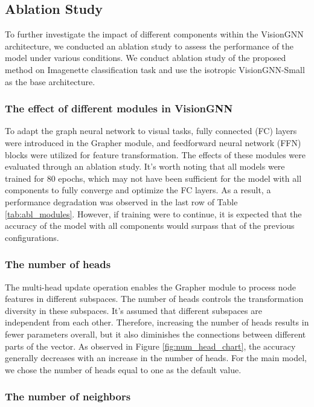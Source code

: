 \documentclass[sigconf, nonacm]{acmart}
\begin{document}
\subsection{Ablation Study}
To further investigate the impact of different components within the VisionGNN architecture, we conducted an ablation study to assess the performance of the model under various conditions. We conduct ablation study of the proposed method on Imagenette classification task and use the isotropic VisionGNN-Small as the base architecture.

\subsubsection{The effect of different modules in VisionGNN}

To adapt the graph neural network to visual tasks, fully connected (FC) layers were introduced in the Grapher module, and feedforward neural network (FFN) blocks were utilized for feature transformation. The effects of these modules were evaluated through an ablation study. It's worth noting that all models were trained for 80 epochs, which may not have been sufficient for the model with all components to fully converge and optimize the FC layers. As a result, a performance degradation was observed in the last row of Table \ref{tab:abl_modules}. However, if training were to continue, it is expected that the accuracy of the model with all components would surpass that of the previous configurations.

\subsubsection{The number of heads} \label{sec:num_heads}

The multi-head update operation enables the Grapher module to process node features in different subspaces. The number of heads controls the transformation diversity in these subspaces. It's assumed that different subspaces are independent from each other. Therefore, increasing the number of heads results in fewer parameters overall, but it also diminishes the connections between different parts of the vector. As observed in Figure \ref{fig:num_head_chart}, the accuracy generally decreases with an increase in the number of heads. For the main model, we chose the number of heads equal to one as the default value.

\subsubsection{The number of neighbors}
\end{document}
